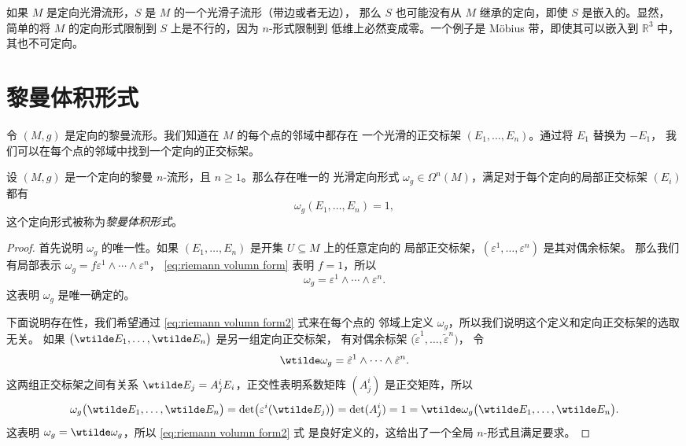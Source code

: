 如果 $M$ 是定向光滑流形，$S$ 是 $M$ 的一个光滑子流形（带边或者无边），
那么 $S$ 也可能没有从 $M$ 继承的定向，即使 $S$ 是嵌入的。显然，
简单的将 $M$ 的定向形式限制到 $S$ 上是不行的，因为 $n$-形式限制到
低维上必然变成零。一个例子是 M\"obius 带，即使其可以嵌入到 $\mathbb{R}^3$
中，其也不可定向。

\section{黎曼体积形式}

令 $(M,g)$ 是定向的黎曼流形。我们知道在 $M$ 的每个点的邻域中都存在
一个光滑的正交标架 $(E_1,\dots,E_n)$。通过将 $E_1$ 替换为 $-E_1$，
我们可以在每个点的邻域中找到一个定向的正交标架。

\begin{proposition}
  设 $(M,g)$ 是一个定向的黎曼 $n$-流形，且 $n\geq 1$。那么存在唯一的
  光滑定向形式 $\omega_g\in\Omega^n(M)$，满足对于每个定向的局部正交标架
  $(E_i)$ 都有
  \begin{equation}\label{eq:riemann volumn form}
    \omega_g(E_1,\dots,E_n)=1,
  \end{equation}
  这个定向形式被称为\emph{黎曼体积形式}。
\end{proposition}
\begin{proof}
  首先说明 $\omega_g$ 的唯一性。如果 $(E_1,\dots,E_n)$ 是开集 $U\subseteq M$ 上的任意定向的
  局部正交标架，$(\varepsilon^1,\dots,\varepsilon^n)$ 是其对偶余标架。
  那么我们有局部表示 $\omega_g=f\varepsilon^1\wedge\cdots\wedge \varepsilon^n$，
  \eqref{eq:riemann volumn form} 表明 $f=1$，所以
  \begin{equation}\label{eq:riemann volumn form2}
    \omega_g=\varepsilon^1\wedge\cdots\wedge\varepsilon^n.
  \end{equation}
  这表明 $\omega_g$ 是唯一确定的。

  下面说明存在性，我们希望通过 \eqref{eq:riemann volumn form2} 式来在每个点的
  邻域上定义 $\omega_g$，所以我们说明这个定义和定向正交标架的选取无关。
  如果 $\bigl(\wtilde E_1,\dots,\wtilde E_n\bigr)$ 是另一组定向正交标架，
  有对偶余标架 $\bigl(\tilde\varepsilon^1,\dots,\tilde\varepsilon^n\bigr)$，
  令
  \[
    \wtilde\omega_g=\tilde\varepsilon^1\wedge\cdots\wedge \tilde\varepsilon^n.
  \]
  这两组正交标架之间有关系 $\wtilde E_j=A_j^iE_i$，正交性表明系数矩阵
  $(A_j^i)$ 是正交矩阵，所以
  \[
    \omega_g\bigl(\wtilde E_1,\dots,\wtilde E_n\bigr)
    =\det\bigl(\varepsilon^i(\wtilde E_j)\bigr)=
    \det(A_j^i)=1=\wtilde\omega_g\bigl(
      \wtilde E_1,\dots,\wtilde E_n
    \bigr).
  \]
  这表明 $\omega_g=\wtilde\omega_g$，所以 \eqref{eq:riemann volumn form2} 式
  是良好定义的，这给出了一个全局 $n$-形式且满足要求。
\end{proof}

